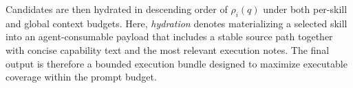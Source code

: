 Candidates are then hydrated in descending order of $\rho_i(q)$ under both per-skill and global context budgets. Here, \emph{hydration} denotes materializing a selected skill into an agent-consumable payload that includes a stable source path together with concise capability text and the most relevant execution notes. The final output is therefore a bounded execution bundle designed to maximize executable coverage within the prompt budget.


